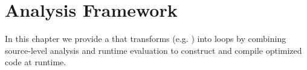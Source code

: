 \chapter{Analysis Framework}
In this chapter we provide a \javascript \algorithm that transforms \pipelines (e.g. ) into  loops by combining source-level analysis and runtime evaluation to construct and compile optimized code at runtime.  







